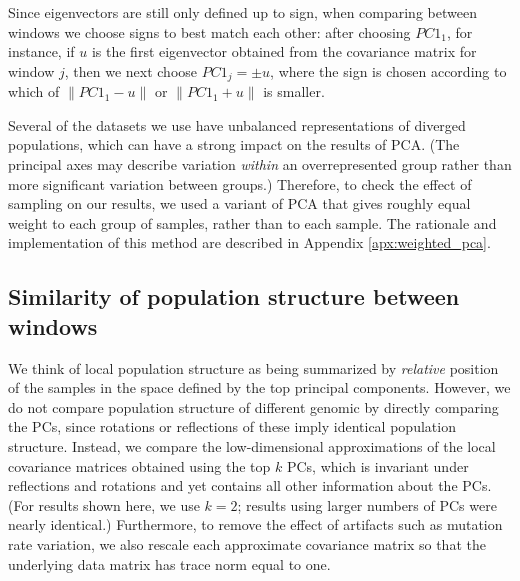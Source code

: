 \documentclass[11pt, oneside]{article}   	%
\newcommand{\pcone}{PC1}
\begin{document}
Since eigenvectors are still only defined up to sign,
when comparing between windows we choose signs to best match each other:
after choosing $\pcone_1$, for instance, 
if $u$ is the first eigenvector obtained from the covariance matrix
for window $j$,
then we next choose $\pcone_j = \pm u$,
where the sign is chosen according to which of 
$\| \pcone_{1} - u \|$ or
$\| \pcone_{1} + u \|$ 
is smaller.

Several of the datasets we use have unbalanced representations of diverged populations,
which can have a strong impact on the results of PCA.
(The principal axes may describe variation \emph{within} an overrepresented group
rather than more significant variation between groups.)
Therefore, to check the effect of sampling on our results,
we used a variant of PCA that gives roughly equal weight to each group of samples,
rather than to each sample.
The rationale and implementation of this method are described in Appendix \ref{apx:weighted_pca}.


\subsection{Similarity of population structure between windows}

We think of local population structure as being summarized by \emph{relative} position of the samples
in the space defined by the top principal components.
However, 
we do not compare population structure of different genomic by directly comparing the PCs,
since rotations or reflections of these imply identical population structure.
Instead, we compare the low-dimensional approximations of the local covariance matrices
obtained using the top $k$ PCs,
which is invariant under reflections and rotations and yet contains all other information about the PCs.
(For results shown here, we use $k=2$;
results using larger numbers of PCs were nearly identical.)
Furthermore, to remove the effect of artifacts such as mutation rate variation,
we also rescale each approximate covariance matrix 
so that the underlying data matrix has trace norm equal to one.
\end{document}
